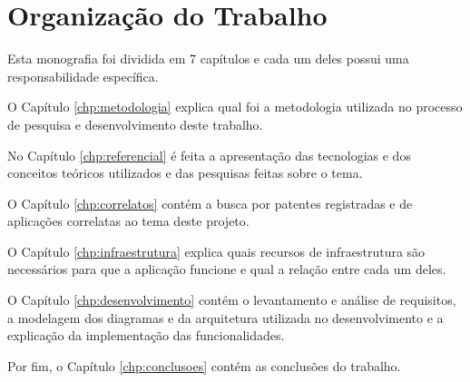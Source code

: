 \section{Organização do Trabalho}\label{sec:estrutura}

Esta monografia foi dividida em 7 capítulos e cada um deles possui uma responsabilidade específica.

O Capítulo \ref{chp:metodologia} explica qual foi a metodologia utilizada no processo de pesquisa e desenvolvimento deste trabalho.

No Capítulo \ref{chp:referencial} é feita a apresentação das tecnologias e dos conceitos teóricos utilizados e das pesquisas feitas sobre o tema.

O Capítulo \ref{chp:correlatos} contém a busca por patentes registradas e de aplicações correlatas ao tema deste projeto.

O Capítulo \ref{chp:infraestrutura} explica quais recursos de infraestrutura são necessários para que a aplicação funcione e qual a relação entre cada um deles.

O Capítulo \ref{chp:desenvolvimento} contém o levantamento e análise de requisitos, a modelagem dos diagramas e da arquitetura utilizada no desenvolvimento e a explicação da implementação das funcionalidades.

Por fim, o Capítulo \ref{chp:conclusoes} contém as conclusões do trabalho.






